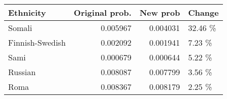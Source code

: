 \begin{tabular}{lrrl}
\toprule
      Ethnicity &  Original prob. &  New prob &  Change \\
\midrule
         Somali &        0.005967 &  0.004031 & 32.46 \% \\
Finnish-Swedish &        0.002092 &  0.001941 &  7.23 \% \\
           Sami &        0.000679 &  0.000644 &  5.22 \% \\
        Russian &        0.008087 &  0.007799 &  3.56 \% \\
           Roma &        0.008367 &  0.008179 &  2.25 \% \\
\bottomrule
\end{tabular}
